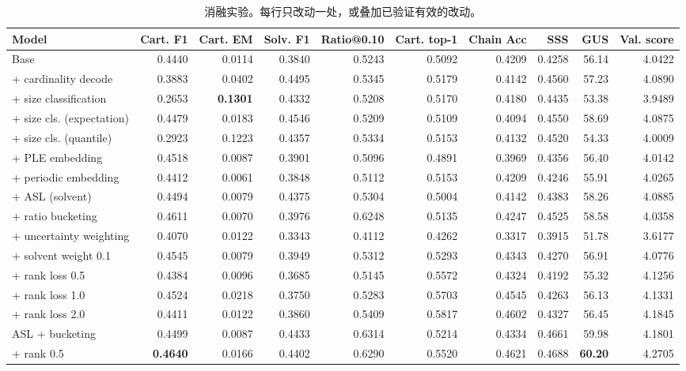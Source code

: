\begin{table}[t]
\centering
\small
\caption{消融实验。每行只改动一处，或叠加已验证有效的改动。}
\label{tab:ablation}
\begin{tabular}{lrrrrrrrrr}
\toprule
Model & Cart. F1 & Cart. EM & Solv. F1 & Ratio@0.10 & Cart. top-1 & Chain Acc & SSS & GUS & Val. score \\
\midrule
Base & 0.4440 & 0.0114 & 0.3840 & 0.5243 & 0.5092 & 0.4209 & 0.4258 & 56.14 & 4.0422 \\
+ cardinality decode & 0.3883 & 0.0402 & 0.4495 & 0.5345 & 0.5179 & 0.4142 & 0.4560 & 57.23 & 4.0890 \\
+ size classification & 0.2653 & \textbf{0.1301} & 0.4332 & 0.5208 & 0.5170 & 0.4180 & 0.4435 & 53.38 & 3.9489 \\
+ size cls. (expectation) & 0.4479 & 0.0183 & 0.4546 & 0.5209 & 0.5109 & 0.4094 & 0.4550 & 58.69 & 4.0875 \\
+ size cls. (quantile) & 0.2923 & 0.1223 & 0.4357 & 0.5334 & 0.5153 & 0.4132 & 0.4520 & 54.33 & 4.0009 \\
+ PLE embedding & 0.4518 & 0.0087 & 0.3901 & 0.5096 & 0.4891 & 0.3969 & 0.4356 & 56.40 & 4.0142 \\
+ periodic embedding & 0.4412 & 0.0061 & 0.3848 & 0.5112 & 0.5153 & 0.4209 & 0.4246 & 55.91 & 4.0265 \\
+ ASL (solvent) & 0.4494 & 0.0079 & 0.4375 & 0.5304 & 0.5004 & 0.4142 & 0.4383 & 58.26 & 4.0885 \\
+ ratio bucketing & 0.4611 & 0.0070 & 0.3976 & 0.6248 & 0.5135 & 0.4247 & 0.4525 & 58.58 & 4.0358 \\
+ uncertainty weighting & 0.4070 & 0.0122 & 0.3343 & 0.4112 & 0.4262 & 0.3317 & 0.3915 & 51.78 & 3.6177 \\
+ solvent weight 0.1 & 0.4545 & 0.0079 & 0.3949 & 0.5312 & 0.5293 & 0.4343 & 0.4270 & 56.91 & 4.0776 \\
+ rank loss 0.5 & 0.4384 & 0.0096 & 0.3685 & 0.5145 & 0.5572 & 0.4324 & 0.4192 & 55.32 & 4.1256 \\
+ rank loss 1.0 & 0.4524 & 0.0218 & 0.3750 & 0.5283 & 0.5703 & 0.4545 & 0.4263 & 56.13 & 4.1331 \\
+ rank loss 2.0 & 0.4411 & 0.0122 & 0.3860 & 0.5409 & 0.5817 & 0.4602 & 0.4327 & 56.45 & 4.1845 \\
ASL + bucketing & 0.4499 & 0.0087 & 0.4433 & 0.6314 & 0.5214 & 0.4334 & 0.4661 & 59.98 & 4.1801 \\
  + rank 0.5 & \textbf{0.4640} & 0.0166 & 0.4402 & 0.6290 & 0.5520 & 0.4621 & 0.4688 & \textbf{60.20} & 4.2705 \\

\end{tabular}
\end{table}
